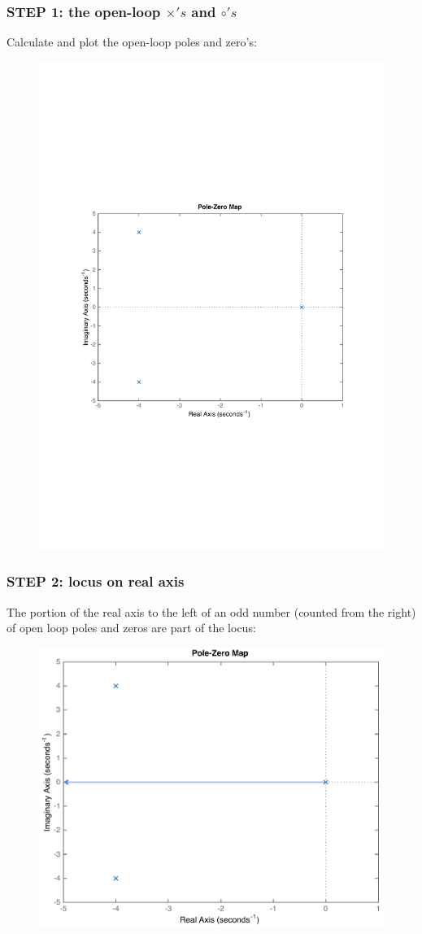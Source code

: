 \begin{frame}
\frametitle{STEP 1: the open-loop $\times's$ and $\circ's$}
	Calculate and plot the open-loop poles and zero's:
	\begin{exampleblock}{}
		\begin{figure}
			\centering
			\includegraphics[width=0.6\linewidth]{how_to_draw_ex1}
		\end{figure}
	\end{exampleblock}
\end{frame}

\begin{frame}
\frametitle{STEP 2: locus on real axis}
	The portion of the real axis to the left of an odd number (counted from the right) of open loop poles and zeros are part of the locus:
	\begin{exampleblock}{}
		\begin{figure}
			\centering
			\includegraphics[width=0.6\linewidth]{how_to_draw_ex2}
		\end{figure}
	\end{exampleblock}
\end{frame}

